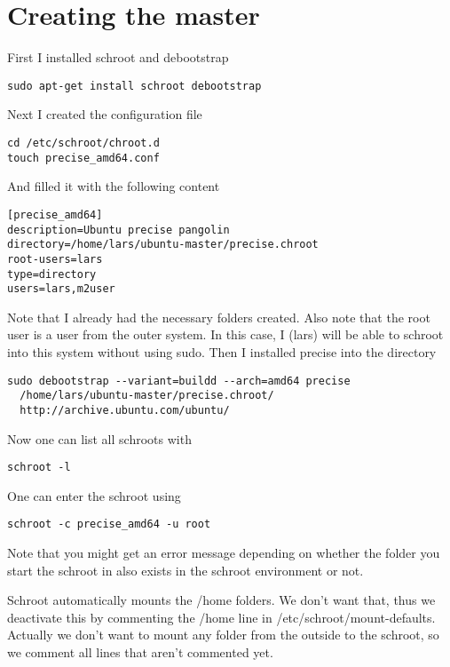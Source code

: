 \documentclass[a4paper]{article}
\begin{document}
\section{Creating the master}
First I installed schroot and debootstrap

\begin{verbatim}
sudo apt-get install schroot debootstrap
\end{verbatim}

Next I created the configuration file

\begin{verbatim}
cd /etc/schroot/chroot.d
touch precise_amd64.conf
\end{verbatim}

And filled it with the following content

\begin{verbatim}
[precise_amd64]
description=Ubuntu precise pangolin
directory=/home/lars/ubuntu-master/precise.chroot
root-users=lars
type=directory
users=lars,m2user
\end{verbatim}

Note that I already had the necessary folders created.
Also note that the root user is a user from the outer system. In this case, I (lars) will be able to schroot into this system without using sudo.
Then I installed precise into the directory

\begin{verbatim}
sudo debootstrap --variant=buildd --arch=amd64 precise 
  /home/lars/ubuntu-master/precise.chroot/ 
  http://archive.ubuntu.com/ubuntu/
\end{verbatim}

Now one can list all schroots with

\begin{verbatim}
schroot -l
\end{verbatim}

One can enter the schroot using

\begin{verbatim}
schroot -c precise_amd64 -u root
\end{verbatim}

Note that you might get an error message depending on whether the folder you start the schroot in also exists in the schroot environment or not.

Schroot automatically mounts the /home folders. We don't want that, thus we deactivate this by commenting the /home line in /etc/schroot/mount-defaults. Actually we don't want to mount any folder from the outside to the schroot, so we comment all lines that aren't commented yet.
\end{document}
